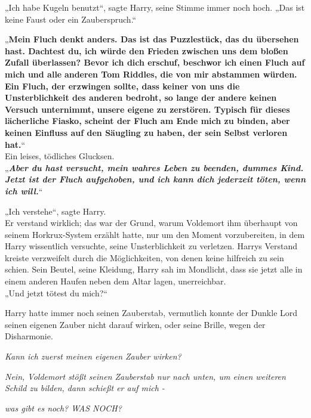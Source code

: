 {„Ich habe Kugeln benutzt“, sagte Harry, seine Stimme immer noch hoch. „Das ist keine Faust oder ein Zauberspruch.“

„\textbf{Mein Fluch denkt anders. Das ist das Puzzlestück, das du übersehen hast. Dachtest du, ich würde den Frieden zwischen uns dem bloßen Zufall überlassen? Bevor ich dich erschuf, beschwor ich einen Fluch auf mich und alle} \textbf{anderen Tom Riddles, die von mir abstammen würden. Ein Fluch, der erzwingen sollte, dass keiner von uns die Unsterblichkeit des anderen bedroht, so lange der andere keinen Versuch unternimmt, unsere eigene zu zerstören. Typisch für dieses lächerliche Fiasko, scheint der Fluch am Ende mich zu binden, aber keinen Einfluss auf den Säugling zu haben, der sein Selbst verloren hat.}“\\ Ein leises, tödliches Glucksen.\\ „\textbf{\emph{Aber du hast versucht, mein wahres Leben zu beenden, dummes Kind. Jetzt ist der Fluch aufgehoben, und ich kann dich jederzeit töten, wenn ich will.}}“

„Ich verstehe“, sagte Harry.\\ Er verstand wirklich; das war der Grund, warum Voldemort ihm überhaupt von seinem Horkrux-System erzählt hatte, nur um den Moment vorzubereiten, in dem Harry wissentlich versuchte, seine Unsterblichkeit zu verletzen. Harrys Verstand kreiste verzweifelt durch die Möglichkeiten, von denen keine hilfreich zu sein schien. Sein Beutel, seine Kleidung, Harry sah im Mondlicht, dass sie jetzt alle in einem anderen Haufen neben dem Altar lagen, unerreichbar.\\ „Und jetzt tötest du mich?“

Harry hatte immer noch seinen Zauberstab, vermutlich konnte der Dunkle Lord seinen eigenen Zauber nicht darauf wirken, oder seine Brille, wegen der Disharmonie.

\emph{Kann ich zuerst meinen eigenen Zauber wirken?}

\emph{Nein, Voldemort stößt seinen Zauberstab nur nach unten, um einen weiteren Schild zu bilden, dann schießt er auf mich -}

\emph{was gibt es noch? WAS NOCH?}

}
